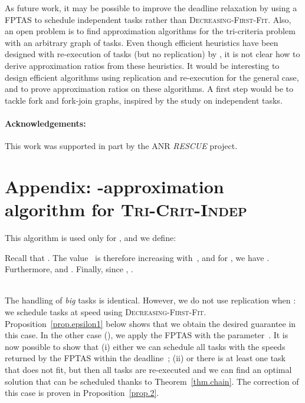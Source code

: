 \documentclass[a4paper]{article}
\theoremstyle{plain}
\theoremstyle{definition}
\theoremstyle{remark}
\newcommand{\dff}{\textsc{Dec\-reasing-First-Fit}\xspace}
\newcommand{\indep}{\textsc{Tri-Crit-In\-dep}\xspace}
\begin{document}
As future work, it may be possible to improve the deadline relaxation
by using a FPTAS to schedule independent tasks \cite{Ausiello99}
rather than \dff \cite{Graham69}.  Also, 
an open problem is to find approximation algorithms for the
tri-criteria problem with an arbitrary graph of tasks. Even though
efficient heuristics have been designed with re-execution of 
tasks (but no replication) by \cite{rr7757}, it is not clear how to
derive approximation ratios from these heuristics. It would be
interesting to 
design efficient algorithms using replication and re-execution for
the general case, and to prove approximation ratios on these
algorithms. A first step would be to tackle fork and fork-join graphs,
inspired by the study on independent tasks. 

\paragraph*{Acknowledgements:}
This work was supported in part by the ANR {\em RESCUE} project. 



 


\clearpage
\appendix

\section*{Appendix:
  -approximation
  algorithm for \indep}


This algorithm is used only for , and we define: 



Recall that . The value~ is therefore increasing
with~, and for , we have .
 Furthermore,  and . Finally, since , . 



\medskip
{} \\
The handling of {\em big} tasks is identical. However, we do not use
replication when : 
we schedule tasks at speed  using
\dff. Proposition~\ref{prop.epsilon1} below shows that we obtain the
desired guarantee in this case.  
In the other case (), we apply
the FPTAS with the parameter~. It is now possible to
show that (i) either we can schedule all tasks with the speeds returned by the
FPTAS within the deadline~; (ii) or there is at least one
task that does not fit, but then all tasks are re-executed and we can find
an optimal solution that can be scheduled thanks to
Theorem~\ref{thm.chain}. The correction of this case is proven in
Proposition~\ref{prop.2}. 
\end{document}
